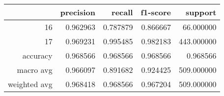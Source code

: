 \begin{tabular}{rrrrr}
\toprule
 & precision & recall & f1-score & support \\
\midrule
16 & 0.962963 & 0.787879 & 0.866667 & 66.000000 \\
17 & 0.969231 & 0.995485 & 0.982183 & 443.000000 \\
accuracy & 0.968566 & 0.968566 & 0.968566 & 0.968566 \\
macro avg & 0.966097 & 0.891682 & 0.924425 & 509.000000 \\
weighted avg & 0.968418 & 0.968566 & 0.967204 & 509.000000 \\
\bottomrule
\end{tabular}
